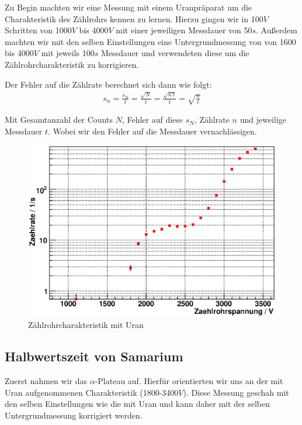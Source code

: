 \documentclass[12pt]{article}
\begin{document}
Zu Begin machten wir eine Messung mit einem Uranpräparat um die Charakteristik des Zählrohrs kennen zu lernen.
Hierzu gingen wir in 100$V$ Schritten von 1000$V$ bis 4000$V$ mit einer jeweiligen Messdauer von 50$s$.
Außerdem machten wir mit den selben Einstellungen eine Untergrundmessung von von 1600 bis 4000$V$ mit jeweils 100$s$
Messdauer und verwendeten diese um die Zählrohrcharakteristik zu korrigieren.

Der Fehler auf die Zählrate berechnet sich dann wie folgt:
\begin{align}
 s_n = \frac{s_N}{t} = \frac{\sqrt{N}}{t} = \frac{\sqrt{n~t}}{t} = \sqrt{\frac{n}{t}}
\end{align}

Mit Gesamtanzahl der Counts $N$, Fehler auf diese $s_N$, Zählrate $n$ und jeweilige Messdauer $t$. Wobei wir den Fehler auf die Messdauer
vernachlässigen.


\begin{figure}[H]  
\centering
\includegraphics[width=0.9\linewidth]{pictures/char_uran.eps}
\caption{Zählrohrcharakteristik mit Uran}
\end{figure}


\subsection{Halbwertszeit von Samarium}
Zuerst nahmen wir das $\alpha$-Plateau auf. Hierfür orientierten wir uns an der mit Uran aufgenommenen Charakteristik (1800-3400$V$).
Diese Messung geschah mit den selben Einstellungen wie die mit Uran und kann daher mit der selben Untergrundmessung korrigiert werden.
\end{document}
